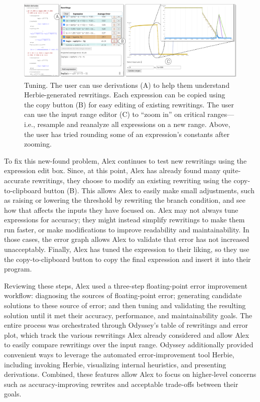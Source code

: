 \begin{figure}
  \centering
  \includegraphics[width=\linewidth]{figures/tuning.png}
  \caption{Tuning. 
  The user can use derivations (A) to help them understand Herbie-generated rewritings.
  Each expression can be copied using the copy button (B) for easy editing of
    existing rewritings.
  The user can use the input range editor (C) to ``zoom in'' on critical ranges---%
    i.e., resample and reanalyze all expressions on a new range. 
    Above, the user has tried rounding some of an expression's constants 
    after zooming.
  }
  \label{fig:tuning}
\end{figure}

To fix this new-found problem,
  Alex continues to test new rewritings
  using the expression edit box.
Since, at this point, Alex has already found
  many quite-accurate rewritings,
  they choose to modify an existing rewriting
  using the copy-to-clipboard button (B).
This allows Alex to easily make small adjustments,
  such as raising or lowering the threshold 
  by rewriting the branch condition,
  and see how that affects the inputs they have focused on.
Alex may not always tune expressions for accuracy;
  they might instead simplify rewritings to make them run faster,
  or make modifications to improve readability and maintainability.
In those cases, the error graph allows Alex to validate
  that error has not increased unacceptably.
Finally, Alex has tuned the expression to their liking,
  so they use the copy-to-clipboard button
  to copy the final expression %
  and insert it into their program.

Reviewing these steps,
  Alex
  used a three-step floating-point error improvement workflow:
  diagnosing the sources of floating-point error;
  generating candidate solutions to these source of error;
  and then tuning and validating the resulting solution
  until it met their accuracy, performance, and maintainability goals.
The entire process was orchestrated
  through Odyssey's table of rewritings and error plot,
  which track the various rewritings Alex already considered
  and allow Alex to easily compare rewritings over the input range.
Odyssey additionally provided convenient ways
  to leverage the automated error-improvement tool Herbie,
  including invoking Herbie, visualizing internal heuristics,
  and presenting derivations.
Combined, these features allow Alex
  to focus on higher-level concerns such as accuracy-improving rewrites
  and acceptable trade-offs between their goals.
